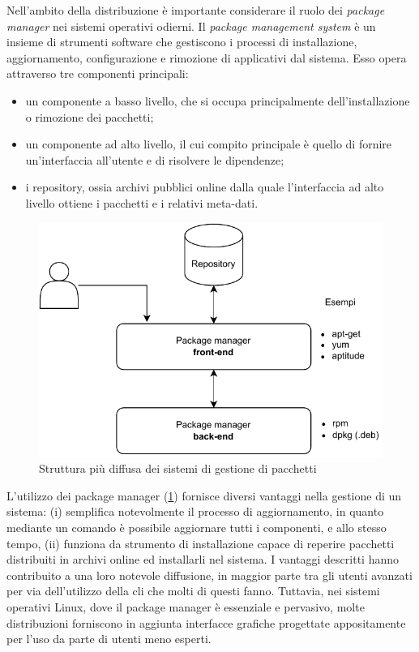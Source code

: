 Nell'ambito della distribuzione è importante considerare il ruolo dei \textit{package manager} nei sistemi operativi odierni. Il \textit{package management system} è un insieme di strumenti software che gestiscono i processi di installazione, aggiornamento, configurazione e rimozione di applicativi dal sistema. Esso opera attraverso tre componenti principali:
\begin{itemize}
	\item un componente a basso livello, che si occupa principalmente dell'installazione o rimozione dei pacchetti;
	\item un componente ad alto livello, il cui compito principale è quello di fornire un'interfaccia all'utente e di risolvere le dipendenze;
	\item i repository, ossia archivi pubblici online dalla quale l'interfaccia ad alto livello ottiene i pacchetti e i relativi meta-dati.
\end{itemize}
\begin{figure}[htb]
	\centering
	\includegraphics[width=.7\linewidth]{figures/package-managers.pdf}
	\caption{Struttura più diffusa dei sistemi di gestione di pacchetti}
	\label{fig:package-managers}
\end{figure}
L'utilizzo dei package manager (\cref{fig:package-managers}) fornisce diversi vantaggi nella gestione di un sistema: (i) semplifica notevolmente il processo di aggiornamento, in quanto mediante un comando è possibile aggiornare tutti i componenti, e allo stesso tempo, (ii) funziona da strumento di installazione capace di reperire pacchetti distribuiti in archivi online ed installarli nel sistema. I vantaggi descritti hanno contribuito a una loro notevole diffusione, in maggior parte tra gli utenti avanzati per via dell'utilizzo della \ac{cli} che molti di questi fanno. Tuttavia, nei sistemi operativi Linux, dove il package manager è essenziale e pervasivo, molte distribuzioni forniscono in aggiunta interfacce grafiche progettate appositamente per l'uso da parte di utenti meno esperti.

